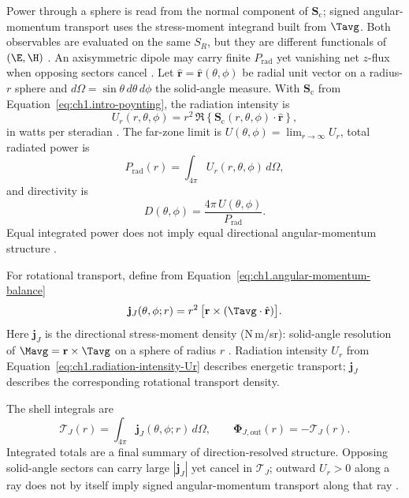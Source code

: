 Power through a sphere is read from the normal component of $\mathbf{S}_\mathrm{c}$; signed angular-momentum transport uses the stress-moment integrand built from $\Tavg$. Both observables are evaluated on the same $S_R$, but they are different functionals of $(\E,\H)$ \cite{poynting1884,belinfante1940,beth1936,stratton1941}. An axisymmetric dipole may carry finite $P_{\mathrm{rad}}$ yet vanishing net $z$-flux when opposing sectors cancel \cite{stratton1941}. Let \(\hat{\mathbf{r}}=\hat{\mathbf{r}}(\theta,\phi)\) be radial unit vector on a
radius-\(r\) sphere and \(d\Omega=\sin\theta\,d\theta\,d\phi\) the solid-angle
measure. With \(\mathbf{S}_\mathrm{c}\) from Equation~\eqref{eq:ch1.intro-poynting}, the radiation intensity is
\begin{equation}
\label{eq:ch1.radiation-intensity-Ur}
U_r(r,\theta,\phi)=
r^2\,\Re\!\left\{\mathbf{S}_\mathrm{c}(r,\theta,\phi)\cdot\hat{\mathbf{r}}\right\},
\end{equation}
in watts per steradian \cite{poynting1884,harrington2001}. The far-zone limit is $U(\theta,\phi)=\lim_{r\to\infty}U_r$, total radiated power is
\begin{equation}
\label{eq:ch1.directional-power-integral}
P_{\mathrm{rad}}(r)=\int_{4\pi}U_r(r,\theta,\phi)\,d\Omega,
\end{equation}
and directivity is
\begin{equation}
\label{eq:ch1.directivity-definition}
D(\theta,\phi)=\frac{4\pi\,U(\theta,\phi)}{P_{\mathrm{rad}}}.
\end{equation}
Equal integrated power does not imply equal directional angular-momentum structure \cite{stratton1941}.

For rotational transport, define from
Equation~\eqref{eq:ch1.angular-momentum-balance}
\begin{equation}
\label{eq:ch1.directional-am-flux}
\mathbf{j}_J(\theta,\phi;r)=
r^2\,\big[\mathbf{r}\times(\Tavg\cdot\hat{\mathbf{r}})\big].
\end{equation}
Here $\mathbf{j}_J$ is the directional stress-moment density (N\,m/sr): solid-angle resolution of $\Mavg=\mathbf{r}\times\Tavg$ on a sphere of radius $r$ \cite{beth1936,stratton1941}. Radiation intensity $U_r$ from Equation~\eqref{eq:ch1.radiation-intensity-Ur} describes energetic transport; $\mathbf{j}_J$ describes the corresponding rotational transport density.

The shell integrals are
\begin{equation}
\label{eq:ch1.directional-am-total}
\boldsymbol{\mathcal{T}}_J(r)=
\int_{4\pi}\mathbf{j}_J(\theta,\phi;r)\,d\Omega,
\qquad
\boldsymbol{\Phi}_{J,\mathrm{out}}(r)=-\boldsymbol{\mathcal{T}}_J(r).
\end{equation}
Integrated totals are a final summary of direction-resolved structure. Opposing solid-angle
sectors can carry large \(|\mathbf{j}_J|\) yet cancel in
\(\boldsymbol{\mathcal{T}}_J\); outward \(U_r>0\) along a ray does not by itself imply
signed angular-momentum transport along that ray \cite{stratton1941,belinfante1940}.

